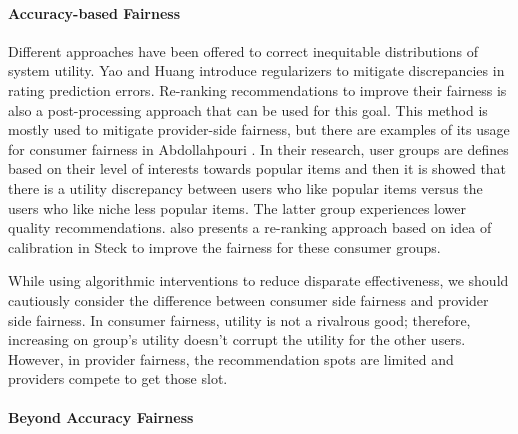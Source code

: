             \vspace{0.25cm}
            \noindent \paragraph{Accuracy-based Fairness}
            \vspace{0.25cm}
                Different approaches have been offered to correct inequitable distributions of system utility. Yao and Huang \cite{yao2017beyond} introduce regularizers to mitigate discrepancies in rating prediction errors. Re-ranking recommendations to improve their fairness is also a post-processing approach that can be used for this goal. This method is mostly used to mitigate provider-side fairness, but there are examples of its usage for consumer fairness in Abdollahpouri \cite{abdollahpouri2020popularity}. In their research, user groups are defines based on their level of interests towards popular items and then it is showed that there is a utility discrepancy between users who like popular items versus the users who like niche less popular items. The latter group experiences lower quality recommendations. \cite{abdollahpouri2020addressing} also presents a re-ranking approach based on idea of calibration in Steck \cite{steck2018calibrated} to improve the fairness for these consumer groups.
            
                While using algorithmic interventions to reduce disparate effectiveness, we should cautiously consider the difference between consumer side fairness and provider side fairness. In consumer fairness, utility is not a rivalrous good; therefore, increasing on group's utility doesn't corrupt the utility for the other users. However, in provider fairness, the recommendation spots are limited and providers compete to get those slot. 
            
            \vspace{0.25cm}
            \noindent \paragraph{Beyond Accuracy Fairness}
            \vspace{0.25cm}
            
